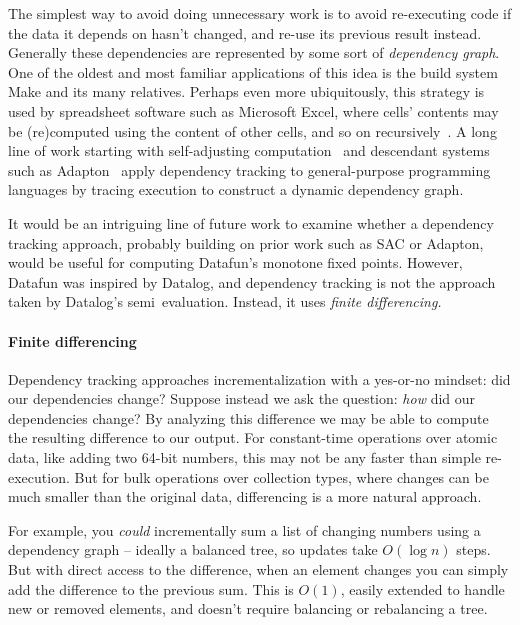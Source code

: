 The simplest way to avoid doing unnecessary work is to avoid re-executing code
if the data it depends on hasn't changed, and re-use its previous result
instead.
%
Generally these dependencies are represented by some sort of \emph{dependency
  graph}.
%
One of the oldest and most familiar applications of this idea is the build
system Make and its many relatives.
%
Perhaps even more ubiquitously, this strategy is used by spreadsheet software such as Microsoft Excel, where cells' contents may be (re)computed using the content of other cells, and so on recursively~\citep{build-systems-a-la-carte}.
%
A long line of work starting with self-adjusting
computation~\citep{DBLP:conf/popl/AcarBH02,umut-acar-thesis} and descendant
systems such as Adapton~\citep{DBLP:conf/pldi/HammerKHF14} apply dependency
tracking to general-purpose programming languages by tracing execution to
construct a dynamic dependency graph.

It would be an intriguing line of future work to examine whether a dependency
tracking approach, probably building on prior work such as SAC or Adapton, would
be useful for computing Datafun's monotone fixed points. However, Datafun was
inspired by Datalog, and dependency tracking is not the approach taken by
Datalog's semi\naive\ evaluation. Instead, it uses \emph{finite differencing.}

\paragraph{Finite differencing}

Dependency tracking approaches incrementalization with a yes-or-no mindset: did
our dependencies change?
%
Suppose instead we ask the question: \emph{how} did our dependencies change?
%
By analyzing this difference we may be able to compute the resulting difference
to our output.
%
For constant-time operations over atomic data, like adding two 64-bit numbers,
this may not be any faster than simple re-execution.
%
But for bulk operations over collection types, where changes can be much smaller
than the original data, differencing is a more natural approach.

For example, you \emph{could} incrementally sum a list of changing numbers using
a dependency graph -- ideally a balanced tree, so updates take $O(\log
n)$ steps.
%
But with direct access to the difference, when an element changes you can simply
add the difference to the previous sum. This is $O(1)$, easily extended to
handle new or removed elements, and doesn't require balancing or rebalancing a
tree.

